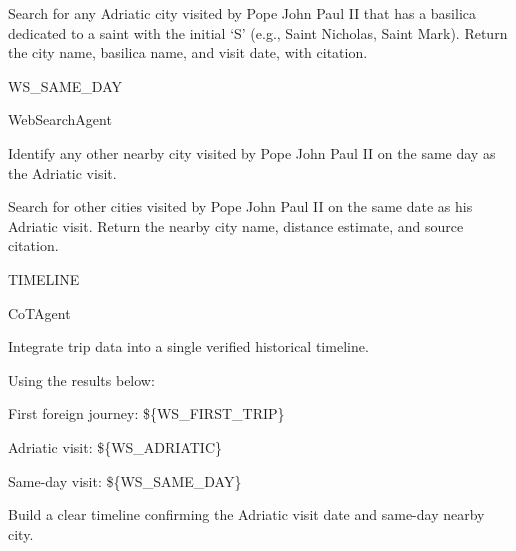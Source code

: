 \begin{userprompt}[title={User Prompt}]
\quad{}

\qquad{}
Search for any Adriatic city visited by Pope John Paul II that has a basilica dedicated to a saint with the initial `S'
(e.g., Saint Nicholas, Saint Mark).
Return the city name, basilica name, and visit date, with citation.

\quad{}



\quad{}WS\_SAME\_DAY

\quad{}WebSearchAgent

\quad{}
Identify any other nearby city visited by Pope John Paul II on the same day as the Adriatic visit.

\quad{}

\qquad{}
Search for other cities visited by Pope John Paul II on the same date as his Adriatic visit.
Return the nearby city name, distance estimate, and source citation.

\quad{}



\quad{}TIMELINE

\quad{}CoTAgent

\quad{}
Integrate trip data into a single verified historical timeline.

\quad{}

\qquad{}
Using the results below:

First foreign journey:
\$\{WS\_FIRST\_TRIP\}

Adriatic visit:
\$\{WS\_ADRIATIC\}

Same-day visit:
\$\{WS\_SAME\_DAY\}

Build a clear timeline confirming the Adriatic visit date and same-day nearby city.

\quad{}




\end{userprompt}
